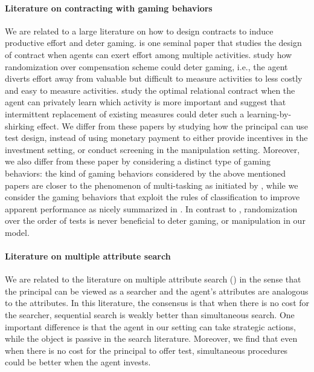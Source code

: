 \paragraph{Literature on contracting with gaming behaviors}
We are related to a large literature on how to design contracts to induce productive effort and deter gaming. 
\citet{holmstrom1987aggregation} is one seminal paper that studies the design of contract when agents can exert effort among multiple activities.
\citet{ederer2018gaming} study how randomization over compensation scheme could deter gaming, i.e., the agent diverts effort away from valuable but difficult to measure activities to less costly and easy to measure activities. 
\citet{li2021learning} study the optimal relational contract when the agent can privately learn which activity is more important and suggest that intermittent replacement of existing measures could deter such a learning-by-shirking effect.
We differ from these papers by studying how the principal can use test design, instead of using monetary payment to either provide incentives in the investment setting, or conduct screening in the manipulation setting.
Moreover, we also differ from these paper by considering a distinct type of gaming behaviors: the kind of gaming behaviors considered by the above mentioned papers are closer to the phenomenon of multi-tasking as initiated by \citet{holmstrom1991multitask}, while we consider the gaming behaviors that exploit the rules of classification to improve apparent performance as nicely summarized in \citet{ederer2018gaming}.
In contrast to \citet{ederer2018gaming}, randomization over the order of tests is never beneficial to deter gaming, or manipulation in our model.


\paragraph{Literature on multiple attribute search}
 We are related to the literature on multiple attribute search (\citet{olszewski2016search, sanjurjo2017search}) in the sense that the principal can be viewed as a searcher and the agent's attributes are analogous to the attributes.
 In this literature, the consensus is that when there is no cost for the searcher, sequential search is weakly better than simultaneous search.
One important difference is that the agent in our setting can take strategic actions, while the object is passive in the search literature.
Moreover, we find that even when there is no cost for the principal to offer test, simultaneous procedures could be better when the agent invests.



